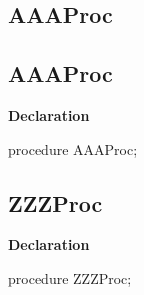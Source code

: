 \documentclass{report}
\newif\ifpdf
\begin{document}
\subsection*{\large{\textbf{AAAProc}}\normalsize\hspace{1ex}\hrulefill}
\else
\subsection*{AAAProc}
\fi
\label{ok_sorting-AAAProc}
\begin{list}{}{
\setlength{\itemindent}{0cm}
\setlength{\listparindent}{0cm}
\setlength{\leftmargin}{\evensidemargin}
\addtolength{\leftmargin}{\tmplength}
\settowidth{\labelsep}{X}
\addtolength{\leftmargin}{\labelsep}
\setlength{\labelwidth}{\tmplength}
}
\item[\textbf{Declaration}\hfill]
\ifpdf
\begin{flushleft}
\fi
\begin{ttfamily}
procedure AAAProc;\end{ttfamily}

\ifpdf
\end{flushleft}
\fi

\end{list}
\ifpdf
\subsection*{\large{\textbf{ZZZProc}}\normalsize\hspace{1ex}\hrulefill}
\else
\subsection*{ZZZProc}
\fi
\label{ok_sorting-ZZZProc}
\begin{list}{}{
\setlength{\itemindent}{0cm}
\setlength{\listparindent}{0cm}
\setlength{\leftmargin}{\evensidemargin}
\addtolength{\leftmargin}{\tmplength}
\settowidth{\labelsep}{X}
\addtolength{\leftmargin}{\labelsep}
\setlength{\labelwidth}{\tmplength}
}
\item[\textbf{Declaration}\hfill]
\ifpdf
\begin{flushleft}
\fi
\begin{ttfamily}
procedure ZZZProc;\end{ttfamily}

\ifpdf
\end{flushleft}
\fi

\end{list}
\end{document}
